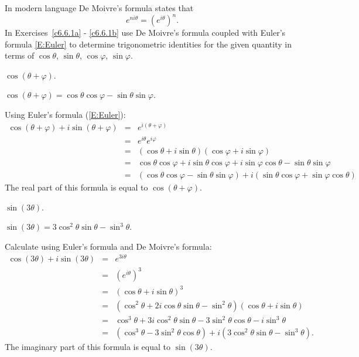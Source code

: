 \documentclass{ximera}
\begin{document}
 In modern language De Moivre's formula states that
\[
e^{ni\theta} = \left(e^{i\theta}\right)^n.
\]
In Exercises~\ref{c6.6.1a} - \ref{c6.6.1b} use De Moivre's formula coupled
with Euler's formula \eqref{E:Euler} to determine trigonometric identities
for the given quantity in terms of $\cos\theta$, $\sin\theta$, $\cos\varphi$,
$\sin\varphi$.
\begin{exercise}  \label{c6.6.1a}
$\cos(\theta+\varphi)$.

\begin{solution}

\ans $\cos(\theta + \varphi) = \cos\theta\cos\varphi -
\sin\theta\sin\varphi$.

\soln Using Euler's formula (\eqref{E:Euler}):
\[
\begin{array}{rcl}
\cos(\theta + \varphi) + i\sin(\theta + \varphi)
& = & e^{i(\theta + \varphi)} \\
& = & e^{i\theta}e^{i\varphi} \\
& = & (\cos\theta + i\sin\theta)(\cos\varphi + i\sin\varphi) \\
& = & \cos\theta\cos\varphi + i\sin\theta\cos\varphi +
i\sin\varphi\cos\theta - \sin\theta\sin\varphi \\
& = & (\cos\theta\cos\varphi - \sin\theta\sin\varphi) +
i(\sin\theta\cos\varphi + \sin\varphi\cos\theta)
\end{array}
\]
The real part of this formula is equal to $\cos(\theta + \varphi)$.

\end{solution}
\end{exercise}
\begin{exercise}  \label{c6.6.1b}
$\sin(3\theta)$.

\begin{solution}

\ans $\sin(3\theta) = 3\cos^2\theta\sin\theta - \sin^3\theta$.

\soln Calculate using Euler's formula and De Moivre's formula:
\[
\begin{array}{rcl}
\cos(3\theta) + i\sin(3\theta)
& = & e^{3i\theta} \\
& = & (e^{i\theta})^3 \\
& = & (\cos\theta + i\sin\theta)^3 \\
& = & (\cos^2\theta + 2i\cos\theta\sin\theta - \sin^2\theta)
(\cos\theta + i\sin\theta) \\
& = & \cos^3\theta + 3i\cos^2\theta\sin\theta -
3\sin^2\theta\cos\theta - i\sin^3\theta \\
& = & (\cos^3\theta - 3\sin^2\theta\cos\theta) +
i(3\cos^2\theta\sin\theta - \sin^3\theta).
\end{array}
\]
The imaginary part of this formula is equal to $\sin(3\theta)$.

\end{solution}
\end{exercise}
\end{document}

